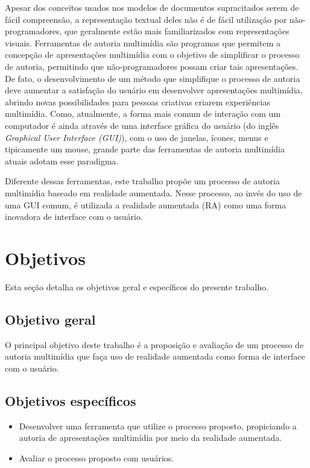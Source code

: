 \documentclass[../main.tex]{subfiles}
\begin{document}
Apesar dos conceitos usados nos modelos de documentos supracitados serem de fácil compreensão, a representação textual deles não é de fácil utilização por não-programadores, que geralmente estão mais familiarizados com representações visuais. Ferramentas de autoria multimídia são programas que permitem a concepção de apresentações multimídia com o objetivo de simplificar o processo de autoria, permitindo que não-programadores possam criar tais apresentações. De fato, o desenvolvimento de um método que simplifique o processo de autoria deve aumentar a satisfação do usuário em desenvolver apresentações multimídia, abrindo novas possibilidades para pessoas criativas criarem experiências multimídia. Como, atualmente, a forma mais comum de interação com um computador é ainda através de uma interface gráfica do usuário (do inglês \emph{Graphical User Interface (GUI)}), com o uso de janelas, ícones, menus e tipicamente um mouse, grande parte das ferramentas de autoria multimídia atuais adotam esse paradigma.

Diferente dessas ferramentas, este trabalho propõe um processo de autoria multimídia baseado em realidade aumentada. Nesse processo, ao invés do uso de uma GUI comum, é utilizada a realidade aumentada (RA) como uma forma inovadora de interface com o usuário.  

\section{Objetivos}
    Esta seção detalha os objetivos geral e específicos do presente trabalho.
\subsection{Objetivo geral}
    O principal objetivo deste trabalho é a proposição e avaliação de um processo de autoria multimídia que faça uso de realidade aumentada como forma de interface com o usuário.
    
\subsection{Objetivos específicos}

\begin{itemize}
    \item Desenvolver uma ferramenta que utilize o processo proposto, propiciando a autoria de apresentações multimídia por meio da realidade aumentada.
    
    \item Avaliar o processo proposto com usuários.
\end{itemize}
\end{document}
